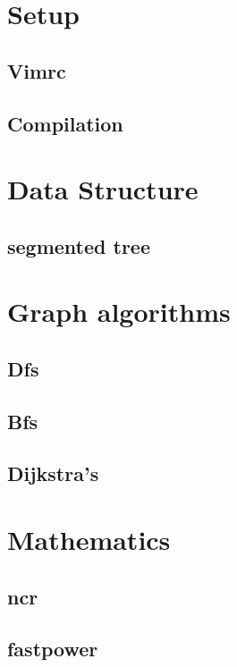 \section{Setup}
\subsection{Vimrc}
\raggedbottom
\hrulefill
\subsection{Compilation}
\raggedbottom
\hrulefill


\section{Data Structure}
\subsection{segmented tree}
\raggedbottom
\section{Graph algorithms}
\subsection{Dfs}
\raggedbottom
\subsection{Bfs}
\raggedbottom
\subsection{Dijkstra's}
\raggedbottom

\section{Mathematics}
\subsection{ncr}
\raggedbottom
\hrulefill
\subsection{fastpower}
\raggedbottom
\hrulefill

